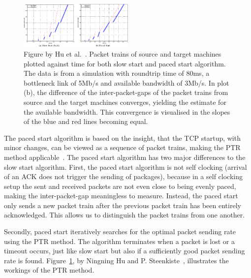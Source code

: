 \begin{figure}
	\includegraphics[width=0.5\textwidth]{images/hu03_PTR.png}
	\caption{Figure by Hu et al.~\cite{Hu03}. Packet trains of source and target machines plotted against time for both slow start and paced start algorithm. The data is from a simulation with roundtrip time of 80ms, a bottleneck link of 5Mb/s and available bandwidth of 3Mb/s. In plot (b), the difference of the inter-packet-gaps of the packet trains from source and the target machines converges, yielding the estimate for the available bandwidth. This convergence is visualised in the slopes of the blue and red lines becoming equal.}
	\label{fig:PTR}
\end{figure}
The paced start algorithm is based on the insight, that the TCP startup, with minor changes, can be viewed as a sequence of packet trains, making the PTR method applicable~\cite{Hu03}. The paced start algorithm has two major differences to the slow start algorithm. First, the paced start algorithm is not self clocking (arrival of an ACK does not trigger the sending of packages), because in a self clocking setup the sent and received packets are not even close to being evenly paced, making the inter-packet-gap meaningless to measure. Instead, the paced start only sends a new packet train after the previous packet train has been entirely acknowledged. This allows us to distinguish the packet trains from one another. 

Secondly, paced start iteratively searches for the optimal packet sending rate using the PTR method. The algorithm terminates when a packet is lost or a timeout occurs, just like slow start but also if a sufficiently good packet sending rate is found. Figure~\ref{fig:PTR}, by Ningning Hu and P. Steenkiste~\cite{Hu03}, illustrates the workings of the PTR method.

